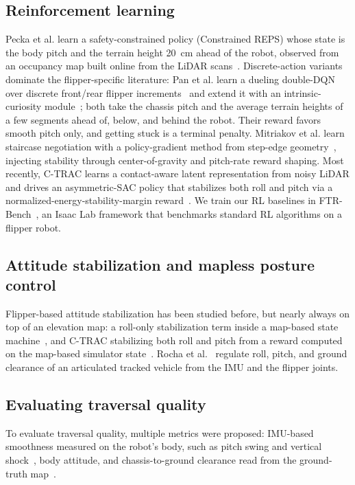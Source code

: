 \subsection{Reinforcement learning}
Pecka et al. learn a
safety-constrained policy (Constrained REPS) whose state is the body pitch and the terrain
height \SI{20}{\centi\metre} ahead of the robot, observed from an occupancy map built online from the LiDAR scans~\cite{pecka2016}. Discrete-action variants dominate the
flipper-specific literature: Pan et al. learn a dueling double-DQN over discrete
front/rear flipper increments~\cite{pan2023atd3qn} and extend it with an
intrinsic-curiosity module~\cite{pan2023icm}; both take the chassis pitch and the average
terrain heights of a few segments ahead of, below, and behind the robot. Their reward favors smooth pitch only, and getting stuck is a terminal
penalty. Mitriakov et al.
learn staircase negotiation with a policy-gradient method from step-edge geometry~\cite{mitriakov2021}, injecting stability through center-of-gravity and
pitch-rate reward shaping. Most recently, C-TRAC learns a contact-aware latent representation from noisy LiDAR and
drives an asymmetric-SAC policy that stabilizes both roll and pitch via a
normalized-energy-stability-margin reward~\cite{ctrac2025}. We train our RL baselines in
FTR-Bench~\cite{ftrbench2025}, an Isaac Lab framework that benchmarks standard RL
algorithms on a flipper robot.

\subsection{Attitude stabilization and mapless posture control}\label{sec:related-posture}
Flipper-based attitude stabilization has been studied before, but nearly always on top of
an elevation map: a roll-only stabilization term inside a map-based state
machine~\cite{azayev2022}, and C-TRAC stabilizing both roll and pitch from a reward computed
on the map-based simulator state~\cite{ctrac2025}. Rocha et al.~\cite{rocha2023} regulate
roll, pitch, and ground clearance of an articulated tracked vehicle from the IMU and the
flipper joints.

\subsection{Evaluating traversal quality}
To evaluate traversal quality, multiple metrics were proposed: IMU-based smoothness
measured on the robot's body, such as pitch swing and vertical
shock~\cite{chen2023}, body attitude, and chassis-to-ground clearance read from the
ground-truth map~\cite{cihala2025,zimmermann2014}.

